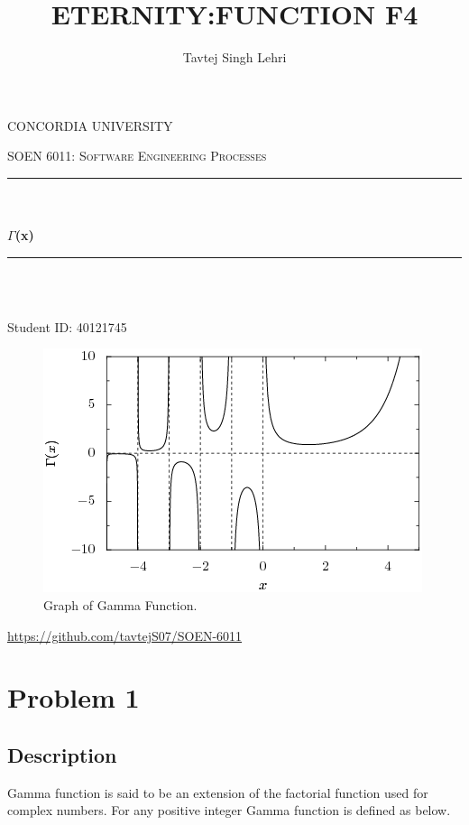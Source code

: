 \documentclass[12pt]{report}
\title{ETERNITY:FUNCTION F4}
\author{Tavtej Singh Lehri}
\date{}
\makeatletter
\let\thetitle\@title
\let\theauthor\@author
\makeatother
\begin{document}
\begin{titlepage}
\centering
\vspace*{0.5 cm}

\begin{center}
\textsc{\Large CONCORDIA UNIVERSITY}\\ [2.0 cm]    
\end{center}

\textsc{\large SOEN 6011: Software Engineering Processes}\\[0.5 cm]
\rule{\linewidth}{0.2 mm}\\[0.4 cm]
{\LARGE \textbf \thetitle}\\[0.2 cm]
{\LARGE \textbf{$\Gamma$(x)}}
\rule{\linewidth}{0.2 mm}\\[1.5 cm]

\begin{center}
    {\Large \textbf{\theauthor}}\\[0.2 cm]
    {\large Student ID: 40121745}\\[2.0 cm]
    
    \begin{figure}[h!]
    \begin{center}
    \includegraphics[width=0.5\linewidth]{Gamma_function.png}
    \end{center}
    \caption{Graph of Gamma Function.\cite{gamma}}
    \end{figure}
    
    {\large \url{https://github.com/tavtejS07/SOEN-6011}}
\end{center}

\end{titlepage}

\tableofcontents
\pagebreak

\renewcommand{\thesection}{\arabic{section}}
\section{Problem 1}
\subsection{Description}
Gamma function is said to be an extension of the factorial function used for complex numbers. For any positive integer Gamma function is defined as below.
\end{document}
